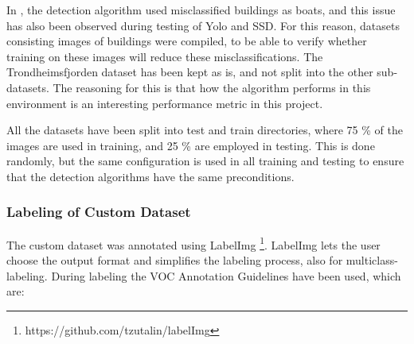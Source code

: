 \noindent
In \citep{Tangstad2017}, the detection algorithm used misclassified buildings as boats, and this issue has also been observed during testing of Yolo and SSD. For this reason, datasets consisting images of buildings were compiled, to be able to verify whether training on these images will reduce these misclassifications. The Trondheimsfjorden dataset has been kept as is, and not split into the other sub-datasets. The reasoning for this is that how the algorithm performs in this environment is an interesting performance metric in this project. 


\vspace{3mm}
\noindent
All the datasets have been split into test and train directories, where 75 \% of the images are used in training, and 25 \% are employed in testing. This is done randomly, but the same configuration is used in all training and testing to ensure that the detection algorithms have the same preconditions.

\subsubsection{Labeling of Custom Dataset}
\label{sec:labeling}
The custom dataset was annotated using LabelImg \footnote{https://github.com/tzutalin/labelImg}. LabelImg lets the user choose the output format and simplifies the labeling process, also for multiclass-labeling. During labeling the VOC Annotation Guidelines \citep{Everingham2012} have been used, which are:




